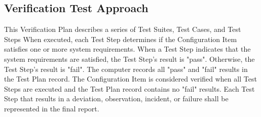\subsection{Verification Test Approach}
This Verification Plan describes a series of Test Suites, Test Cases, and Test
Steps When executed, each Test Step determines if the Configuration Item
satisfies one or more system requirements.  When a Test Step indicates that
the system requirements are satisfied, the Test Step's result is "pass".
Otherwise, the Test Step's result is "fail".  The computer records all "pass"
and "fail" results in the Test Plan record.  The Configuration Item is
considered verified when all Test Steps are executed and the Test Plan record
contains no "fail" results.  Each Test Step that results in a deviation,
observation, incident, or failure shall be represented in the final report.
